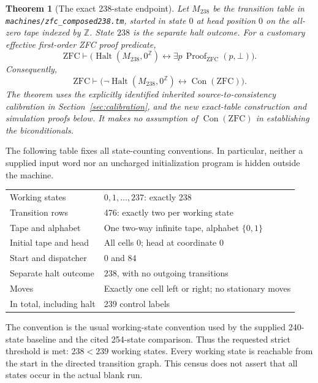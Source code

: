 \documentclass[11pt]{article}
\newtheorem{theorem}{Theorem}[section]
\theoremstyle{definition}\newtheorem{definition}[theorem]{Definition}
\newcommand{\Con}{\operatorname{Con}}
\newcommand{\Halt}{\operatorname{Halt}}
\newcommand{\ZFC}{\mathrm{ZFC}}
\newcommand{\bits}{\{0,1\}}
\newcommand{\file}[1]{\nolinkurl{#1}}
\begin{document}
\begin{theorem}[The exact 238-state endpoint]
Let $M_{238}$ be the transition table in
\file{machines/zfc_composed238.tm}, started in state $0$ at head position $0$
on the all-zero tape indexed by $\mathbb Z$.  State $238$ is the separate
halt outcome.  For a customary effective first-order ZFC proof predicate,
\[
 \ZFC\vdash
 \bigl(\Halt(M_{238},0^{\mathbb Z})
 \longleftrightarrow
 \exists p\,\operatorname{Proof}_{\ZFC}(p,\bot)\bigr).
 \tag{1}
\]
Consequently,
\[
 \boxed{\quad\ZFC\vdash
 \bigl(\neg\Halt(M_{238},0^{\mathbb Z})
 \longleftrightarrow\Con(\ZFC)\bigr).\quad}
 \tag{2}
\]
The theorem uses the explicitly identified inherited source-to-consistency
calibration in Section~\ref{sec:calibration}, and the new exact-table
construction and simulation proofs below.  It makes no assumption of
$\Con(\ZFC)$ in establishing the biconditionals.
\end{theorem}

The following table fixes all state-counting conventions.  In particular,
neither a supplied input word nor an uncharged initialization program is
hidden outside the machine.

\begin{center}
\begin{tabular}{ll}
\toprule
Working states & $0,1,\ldots,237$: exactly 238\\
Transition rows & 476: exactly two per working state\\
Tape and alphabet & One two-way infinite tape, alphabet $\bits$\\
Initial tape and head & All cells $0$; head at coordinate $0$\\
Start and dispatcher & $0$ and $84$\\
Separate halt outcome & $238$, with no outgoing transitions\\
Moves & Exactly one cell left or right; no stationary moves\\
In total, including halt & 239 control labels\\
\bottomrule
\end{tabular}
\end{center}

The convention is the usual working-state convention used by the supplied
240-state baseline and the cited 254-state comparison.  Thus the requested
strict threshold is met: $238<239$ working states.  Every working state is
reachable from the start in the directed transition graph.  This census
does not assert that all states occur in the actual blank run.
\end{document}
